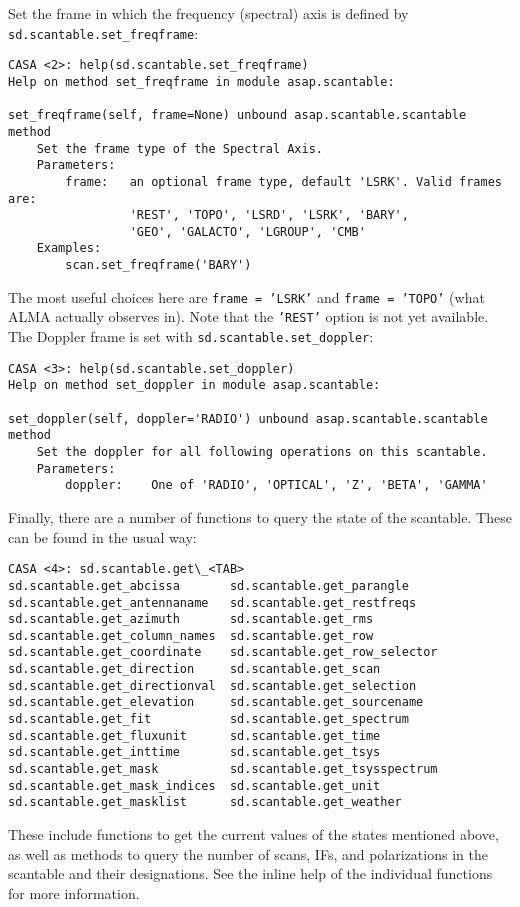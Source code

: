 Set the frame in which the frequency (spectral) axis is defined by {\tt sd.scantable.set\_freqframe}:
\small
\begin{verbatim}
CASA <2>: help(sd.scantable.set_freqframe)
Help on method set_freqframe in module asap.scantable:

set_freqframe(self, frame=None) unbound asap.scantable.scantable method
    Set the frame type of the Spectral Axis.
    Parameters:
        frame:   an optional frame type, default 'LSRK'. Valid frames are:
                 'REST', 'TOPO', 'LSRD', 'LSRK', 'BARY',
                 'GEO', 'GALACTO', 'LGROUP', 'CMB'
    Examples:
        scan.set_freqframe('BARY')
\end{verbatim}
\normalsize
The most useful choices here are {\tt frame = 'LSRK'} 
and {\tt frame = 'TOPO'} (what ALMA actually observes in). 
Note that the {\tt 'REST'} option is not yet available.
The Doppler frame is set with {\tt sd.scantable.set\_doppler}:
\small
\begin{verbatim}
CASA <3>: help(sd.scantable.set_doppler)
Help on method set_doppler in module asap.scantable:

set_doppler(self, doppler='RADIO') unbound asap.scantable.scantable method
    Set the doppler for all following operations on this scantable.
    Parameters:
        doppler:    One of 'RADIO', 'OPTICAL', 'Z', 'BETA', 'GAMMA'
\end{verbatim}
\normalsize

Finally, there are a number of functions to query the state of the
scantable.  These can be found in the usual way:
\small
\begin{verbatim}
CASA <4>: sd.scantable.get\_<TAB>
sd.scantable.get_abcissa       sd.scantable.get_parangle
sd.scantable.get_antennaname   sd.scantable.get_restfreqs
sd.scantable.get_azimuth       sd.scantable.get_rms
sd.scantable.get_column_names  sd.scantable.get_row
sd.scantable.get_coordinate    sd.scantable.get_row_selector
sd.scantable.get_direction     sd.scantable.get_scan
sd.scantable.get_directionval  sd.scantable.get_selection
sd.scantable.get_elevation     sd.scantable.get_sourcename
sd.scantable.get_fit           sd.scantable.get_spectrum
sd.scantable.get_fluxunit      sd.scantable.get_time
sd.scantable.get_inttime       sd.scantable.get_tsys
sd.scantable.get_mask          sd.scantable.get_tsysspectrum
sd.scantable.get_mask_indices  sd.scantable.get_unit
sd.scantable.get_masklist      sd.scantable.get_weather
\end{verbatim}
\normalsize
These include functions to get the current values of the states
mentioned above, as well as
methods to query the number of scans, IFs, and polarizations
in the scantable and their designations.  See the
inline help of the individual functions for more information.

